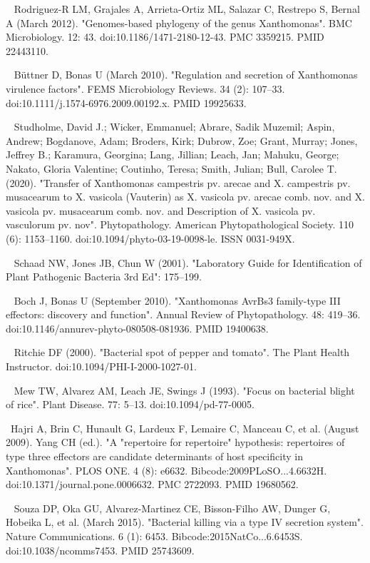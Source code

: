 \documentclass[11pt]{article}
\begin{document}
\begin{thebibliography}{3}
	~ Rodriguez-R LM, Grajales A, Arrieta-Ortiz ML, Salazar C, Restrepo S, Bernal A (March 2012). "Genomes-based phylogeny of the genus Xanthomonas". BMC Microbiology. 12: 43. doi:10.1186/1471-2180-12-43. PMC 3359215. PMID 22443110.
	
	~ Büttner D, Bonas U (March 2010). "Regulation and secretion of Xanthomonas virulence factors". FEMS Microbiology Reviews. 34 (2): 107–33. doi:10.1111/j.1574-6976.2009.00192.x. PMID 19925633.
	
	~ Studholme, David J.; Wicker, Emmanuel; Abrare, Sadik Muzemil; Aspin, Andrew; Bogdanove, Adam; Broders, Kirk; Dubrow, Zoe; Grant, Murray; Jones, Jeffrey B.; Karamura, Georgina; Lang, Jillian; Leach, Jan; Mahuku, George; Nakato, Gloria Valentine; Coutinho, Teresa; Smith, Julian; Bull, Carolee T. (2020). "Transfer of Xanthomonas campestris pv. arecae and X. campestris pv. musacearum to X. vasicola (Vauterin) as X. vasicola pv. arecae comb. nov. and X. vasicola pv. musacearum comb. nov. and Description of X. vasicola pv. vasculorum pv. nov". Phytopathology. American Phytopathological Society. 110 (6): 1153–1160. doi:10.1094/phyto-03-19-0098-le. ISSN 0031-949X.
	
	~ Schaad NW, Jones JB, Chun W (2001). "Laboratory Guide for Identification of Plant Pathogenic Bacteria 3rd Ed": 175–199.
	
	~ Boch J, Bonas U (September 2010). "Xanthomonas AvrBs3 family-type III effectors: discovery and function". Annual Review of Phytopathology. 48: 419–36. doi:10.1146/annurev-phyto-080508-081936. PMID 19400638.
	
	~ Ritchie DF (2000). "Bacterial spot of pepper and tomato". The Plant Health Instructor. doi:10.1094/PHI-I-2000-1027-01.
	
	~ Mew TW, Alvarez AM, Leach JE, Swings J (1993). "Focus on bacterial blight of rice". Plant Disease. 77: 5–13. doi:10.1094/pd-77-0005.
	
	~Hajri A, Brin C, Hunault G, Lardeux F, Lemaire C, Manceau C, et al. (August 2009). Yang CH (ed.). "A "repertoire for repertoire" hypothesis: repertoires of type three effectors are candidate determinants of host specificity in Xanthomonas". PLOS ONE. 4 (8): e6632. Bibcode:2009PLoSO...4.6632H. doi:10.1371/journal.pone.0006632. PMC 2722093. PMID 19680562.
	
	~ Souza DP, Oka GU, Alvarez-Martinez CE, Bisson-Filho AW, Dunger G, Hobeika L, et al. (March 2015). "Bacterial killing via a type IV secretion system". Nature Communications. 6 (1): 6453. Bibcode:2015NatCo...6.6453S. doi:10.1038/ncomms7453. PMID 25743609.
	

\end{thebibliography}
\end{document}
